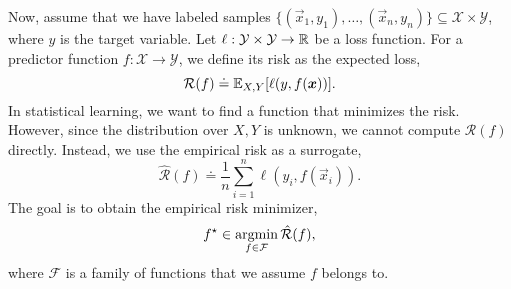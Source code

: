 Now, assume that we have labeled samples $\{ (\vec{x}_1, y_1), \ldots, (\vec{x}_n, y_n) \}
    \subseteq \mathcal{X} \times \mathcal{Y}$, where $y$ is the target variable. Let $\ell: \mathcal{Y}
    \times \mathcal{Y} \to \mathbb{R}$ be a loss function. For a predictor function $f: \mathcal{X} \to
    \mathcal{Y}$, we define its risk as the expected loss, \[
    \mathcal{R}(f) \doteq \mathbb{E}_{X, Y} [\ell(y, f(\bm{x}))].
\]
In statistical learning, we want to find a function that minimizes the risk. However, since the
distribution over $X,Y$ is unknown, we cannot compute $\mathcal{R}(f)$ directly. Instead, we use
the empirical risk as a surrogate, \[
    \hat{\mathcal{R}}(f) \doteq \frac{1}{n} \sum_{i=1}^{n} \ell(y_i, f(\vec{x}_i)).
\]
The goal is to obtain the empirical risk minimizer, \[
    f^\star \in \operatorname*{argmin}_{f \in \mathcal{F}} \hat{\mathcal{R}}(f),
\]
where $\mathcal{F}$ is a family of functions that we assume $f$ belongs to.

